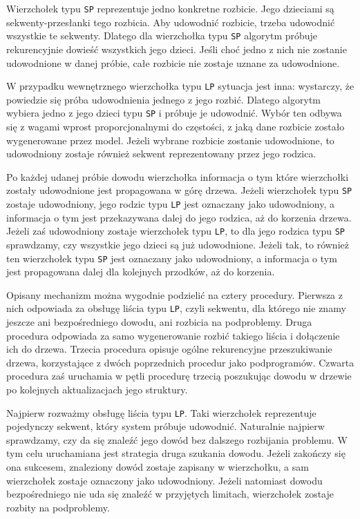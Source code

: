 \documentclass[shortabstract]{iithesis}
\theoremstyle{definition}
\theoremstyle{remark}
\theoremstyle{plain}
\begin{document}
Wierzchołek typu \texttt{SP} reprezentuje jedno konkretne rozbicie. Jego dzieciami są
sekwenty-przesłanki tego rozbicia. Aby udowodnić rozbicie, trzeba udowodnić
wszystkie te sekwenty. Dlatego dla wierzchołka typu \texttt{SP} algorytm próbuje
rekurencyjnie dowieść wszystkich jego dzieci. Jeśli choć jedno z nich nie zostanie
udowodnione w danej próbie, całe rozbicie nie zostaje uznane za udowodnione.

W przypadku wewnętrznego wierzchołka typu \texttt{LP} sytuacja jest inna: wystarczy,
że powiedzie się próba udowodnienia jednego z jego rozbić. Dlatego algorytm wybiera
jedno z jego dzieci typu \texttt{SP} i próbuje je udowodnić. Wybór ten odbywa się
z wagami wprost proporcjonalnymi do częstości, z jaką dane rozbicie zostało
wygenerowane przez model. Jeżeli wybrane rozbicie zostanie udowodnione, to
udowodniony zostaje również sekwent reprezentowany przez jego rodzica.

Po każdej udanej próbie dowodu wierzchołka informacja o tym które wierzchołki zostały udowodnione
jest propagowana w górę drzewa. Jeżeli wierzchołek typu \texttt{SP} zostaje udowodniony, 
jego rodzic typu \texttt{LP} jest oznaczany jako udowodniony, a informacja o tym jest przekazywana 
dalej do jego rodzica, aż do korzenia drzewa.
Jeżeli zaś udowodniony zostaje wierzchołek typu \texttt{LP}, to dla jego rodzica typu \texttt{SP} 
sprawdzamy, czy wszystkie jego dzieci są już udowodnione. Jeżeli tak, to również ten wierzchołek typu \texttt{SP}
jest oznaczany jako udowodniony, a informacja o tym jest propagowana dalej dla kolejnych przodków, aż do korzenia.

Opisany mechanizm można wygodnie podzielić na cztery procedury. Pierwsza z nich
odpowiada za obsługę liścia typu \texttt{LP}, czyli sekwentu, dla którego nie znamy
jeszcze ani bezpośredniego dowodu, ani rozbicia na podproblemy. Druga procedura
odpowiada za samo wygenerowanie rozbić takiego liścia i dołączenie ich do drzewa.
Trzecia procedura opisuje ogólne rekurencyjne przeszukiwanie drzewa, korzystające
z dwóch poprzednich procedur jako podprogramów. Czwarta procedura zaś uruchamia w pętli 
procedurę trzecią poszukując dowodu w drzewie po kolejnych aktualizacjach jego struktury.

Najpierw rozważmy obsługę liścia typu \texttt{LP}. Taki wierzchołek reprezentuje
pojedynczy sekwent, który system próbuje udowodnić. Naturalnie najpierw sprawdzamy,
czy da się znaleźć jego dowód bez dalszego rozbijania problemu. W tym celu
uruchamiana jest strategia druga szukania dowodu.
Jeżeli zakończy się ona sukcesem, znaleziony dowód zostaje zapisany w wierzchołku,
a sam wierzchołek zostaje oznaczony jako udowodniony. Jeżeli natomiast dowodu
bezpośredniego nie uda się znaleźć w przyjętych limitach, wierzchołek zostaje
rozbity na podproblemy.
\end{document}
